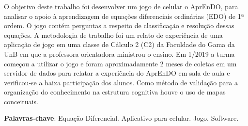 \begin{resumo}
O objetivo deste trabalho foi desenvolver um jogo de celular o AprEnDO, para analisar o
 apoio à aprendizagem de equações diferenciais ordinárias (EDO) de 1ª ordem.
 O jogo contém perguntas a respeito de classificação e resolução dessas equações. A metodologia
 de trabalho foi um relato de experiência de uma aplicação de jogo em uma classe de Cálculo 2 (C2) da Faculdade do Gama da UnB em que a professora orientadora ministrou o ensino. Em 1/2019 a turma começou a utilizar o jogo e foram aproximadamente 2 meses de coletas em um servidor de dados para relatar a experiência do AprEnDO em sala de aula e verificou-se a baixa participação dos alunos. Como método de validação para a organização do conhecimento na estrutura cognitiva houve o uso de mapas conceituais.
	
\begin{comment}
 Com a qualidade de ensino de matemática baixa e contra os métodos muito
 tradicionais de ensino nas salas de aula, resolveu-se desenvolver um 
 aplicativo para celular (iOS e Android) que seja um jogo para o suporte de 
 ensino de equações diferenciais (ED). Será realizada uma pesquisa descritiva
 para o levantamento bibliográfico das características que deverão estar presentes
 no software para dar auxílio a alunos com TDAH junto de técnicas de gamificação 
 para tentar deixar o aprendizado mais prazeroso.
\end{comment}
  
 \begin{comment}
 O resumo deve ressaltar o objetivo, o método, os resultados e as conclusões 
 do documento. A ordem e a extensão
 destes itens dependem do tipo de resumo (informativo ou indicativo) e do
 tratamento que cada item recebe no documento original. O resumo deve ser
 precedido da referência do documento, com exceção do resumo inserido no
 próprio documento. (\ldots) As palavras-chave devem figurar logo abaixo do
 resumo, antecedidas da expressão Palavras-chave:, separadas entre si por
 ponto e finalizadas também por ponto. O texto pode conter no mínimo 150 e 
 no máximo 500 palavras, é aconselhável que sejam utilizadas 200 palavras. 
 E não se separa o texto do resumo em parágrafos.
 \end{comment}

 \vspace{\onelineskip}
    
 \noindent
 \textbf{Palavras-chave}: Equação Diferencial. Aplicativo para celular. Jogo. Software.
\end{resumo}
